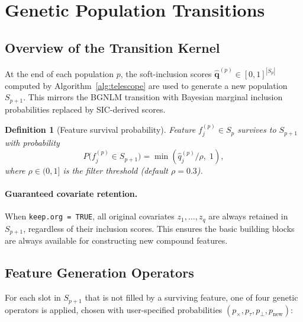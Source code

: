 \documentclass[12pt,a4paper]{article}
\newtheorem{definition}{Definition}
\begin{document}
\section{Genetic Population Transitions}
\label{sec:genetic}

\subsection{Overview of the Transition Kernel}

At the end of each population $p$, the soft-inclusion scores
$\hat{\mathbf{q}}^{(p)} \in [0,1]^{|S_p|}$ computed by
Algorithm~\ref{alg:telescope} are used to generate a new population $S_{p+1}$.
This mirrors the BGNLM transition \citep{Hubin2021JAIR} with Bayesian marginal
inclusion probabilities replaced by SIC-derived scores.

\begin{definition}[Feature survival probability]
  Feature $f_j^{(p)}\in S_p$ survives to $S_{p+1}$ with probability
  \begin{equation}
    P\bigl(f_j^{(p)} \in S_{p+1}\bigr)
    = \min\!\left(\hat q_j^{(p)} \big/ \rho,\; 1\right),
    \label{eq:survival}
  \end{equation}
  where $\rho \in (0,1]$ is the \emph{filter threshold} (default $\rho=0.3$).
\end{definition}

\paragraph{Guaranteed covariate retention.}
When \texttt{keep.org = TRUE}, all original covariates $z_1,\ldots,z_q$ are
always retained in $S_{p+1}$, regardless of their inclusion scores.  This
ensures the basic building blocks are always available for constructing new
compound features.

\subsection{Feature Generation Operators}

For each slot in $S_{p+1}$ that is not filled by a surviving feature, one of
four genetic operators is applied, chosen with user-specified probabilities
$(p_{\times}, p_{\tau}, p_{\perp}, p_{\text{new}})$:
\end{document}
